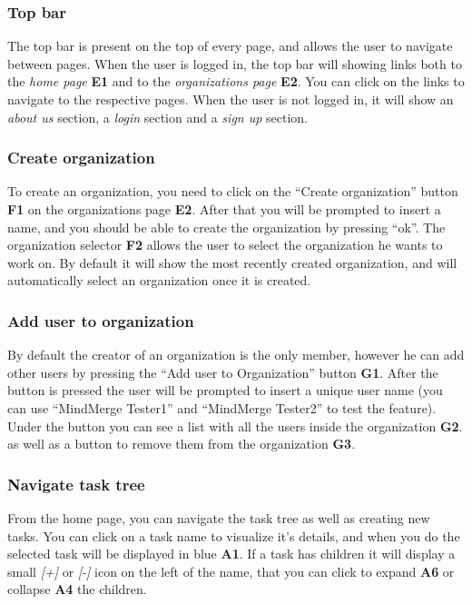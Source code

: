 \documentclass{article}
\begin{document}
\subsubsection{Top bar}

The top bar is present on the top of every page, and allows the user to navigate between pages.
\newline
When the user is logged in, the top bar will showing links both to the \textit{home page} \textbf{E1} and to the \textit{organizations page} \textbf{E2}.
You can click on the links to navigate to the respective pages.
\newline
When the user is not logged in, it will show an \textit{about us} section, a \textit{login} section and a \textit{sign up} section.

\subsubsection{Create organization}

To create an organization, you need to click on the ``Create organization'' button \textbf{F1} on the organizations page \textbf{E2}.
After that you will be prompted to insert a name, and you should be able to create the organization by pressing ``ok''.
\newline
The organization selector \textbf{F2} allows the user to select the organization he wants to work on. By default
it will show the most recently created organization, and will automatically select an organization once it is created.

\subsubsection{Add user to organization}

By default the creator of an organization is the only member,
however he can add other users by pressing the ``Add user to Organization'' button \textbf{G1}.
After the button is pressed the user will be prompted to insert a unique user name (you can use ``MindMerge Tester1'' and ``MindMerge Tester2'' to test the feature).
\newline
Under the button you can see a list with all the users inside the organization \textbf{G2}.
as well as a button to remove them from the organization \textbf{G3}.
\subsubsection{Navigate task tree}
From the home page, you can navigate the task tree as well as creating new tasks.
\newline
You can click on a task name to visualize it's details, and when you do the selected task will be displayed in blue \textbf{A1}.
If a task has children it will display a small \textit{[+]} or \textit{[-]}
icon on the left of the name, that you can click to expand \textbf{A6} or collapse \textbf{A4} the children.
\end{document}
